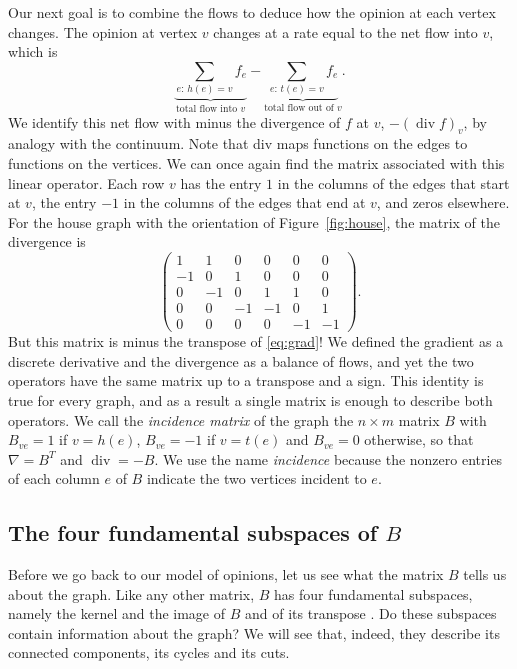 \documentclass[11pt,a4paper]{article}
\theoremstyle{plain}
\theoremstyle{definition}
\begin{document}
Our next goal is to combine the flows to deduce how the opinion at each vertex changes. The opinion at vertex $v$ changes at a rate equal to the net flow into $v$, which is
\[
\underbrace{\sum_{e:\,h(e)=v}f_e}_{\text{total flow into }v} - \underbrace{\sum_{e:\,t(e)=v}f_e}_{\text{total flow out of }v}.
\]
We identify this net flow with minus the divergence of $f$ at $v$, $-(\operatorname{div}f)_v$, by analogy with the continuum. Note that div maps functions on the edges to functions on the vertices. We can once again find the matrix associated with this linear operator. Each row $v$ has the entry $1$ in the columns of the edges that start at $v$, the entry $-1$ in the columns of the edges that end at $v$, and zeros elsewhere. For the house graph with the orientation of Figure~\ref{fig:house}, the matrix of the divergence is
\[
\begin{pmatrix}
 1& 1& 0& 0& 0& 0\\
-1& 0& 1& 0& 0& 0\\
 0&-1& 0& 1& 1& 0\\
 0& 0&-1&-1& 0& 1\\
 0& 0& 0& 0&-1&-1
\end{pmatrix}.
\]
But this matrix is minus the transpose of \eqref{eq:grad}! We defined the gradient as a discrete derivative and the divergence as a balance of flows, and yet the two operators have the same matrix up to a transpose and a sign. This identity is true for every graph, and as a result a single matrix is enough to describe both operators. We call the \emph{incidence matrix} of the graph the $n\times m$ matrix $B$ with $B_{ve}=1$ if $v=h(e)$, $B_{ve}=-1$ if $v=t(e)$ and $B_{ve}=0$ otherwise, so that $\nabla=B^T$ and $\operatorname{div}=-B$. We use the name \emph{incidence} because the nonzero entries of each column $e$ of $B$ indicate the two vertices incident to $e$.

\subsection{The four fundamental subspaces of $B$}\label{sec:subspaces}

Before we go back to our model of opinions, let us see what the matrix $B$ tells us about the graph. Like any other matrix, $B$ has four fundamental subspaces, namely the kernel and the image of $B$ and of its transpose \cite{strang1993}. Do these subspaces contain information about the graph? We will see that, indeed, they describe its connected components, its cycles and its cuts. 
\end{document}
